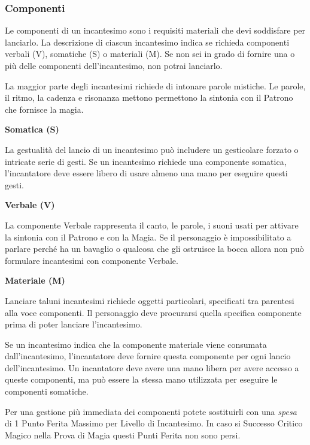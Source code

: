 \begin{multicols}{2}
\subsubsection{Componenti}\label{magiecomponenti}

Le componenti di un incantesimo sono i requisiti materiali che devi soddisfare per lanciarlo. La descrizione di ciascun incantesimo indica se richieda componenti verbali (V), somatiche (S) o materiali (M). Se non sei in grado di fornire una o più delle componenti dell'incantesimo, non potrai lanciarlo.

La maggior parte degli incantesimi richiede di intonare parole mistiche. Le parole, il ritmo, la cadenza e risonanza mettono permettono la sintonia con il Patrono che fornisce la magia.

\textbf{Somatica (S)}

La gestualità del lancio di un incantesimo può includere un gesticolare forzato o intricate serie di gesti. Se un incantesimo richiede una componente somatica, l'incantatore deve essere libero di usare almeno una mano per eseguire questi gesti.

\textbf{Verbale (V)}

La componente Verbale rappresenta il canto, le parole, i suoni usati per attivare la sintonia con il Patrono e con la Magia. Se il personaggio è impossibilitato a parlare perché ha un bavaglio o qualcosa che gli ostruisce la bocca allora non può formulare incantesimi con componente Verbale.

\textbf{Materiale (M)}

Lanciare taluni incantesimi richiede oggetti particolari, specificati tra parentesi alla voce componenti. Il personaggio deve procurarsi quella specifica componente prima di poter lanciare l'incantesimo.

Se un incantesimo indica che la componente materiale viene consumata dall'incantesimo, l'incantatore deve fornire questa componente per ogni lancio dell'incantesimo.
Un incantatore deve avere una mano libera per avere accesso a queste componenti, ma può essere la stessa mano utilizzata per eseguire le componenti somatiche.

\begin{changemargin}{0.3cm}{0.3cm}\begin{narratore}
Per una gestione più immediata dei componenti potete sostituirli con una \emph{spesa} di 1 Punto Ferita Massimo per Livello di Incantesimo. In caso si Successo Critico Magico nella Prova di Magia questi Punti Ferita non sono persi.
\end{narratore}\end{changemargin}


\end{multicols}
